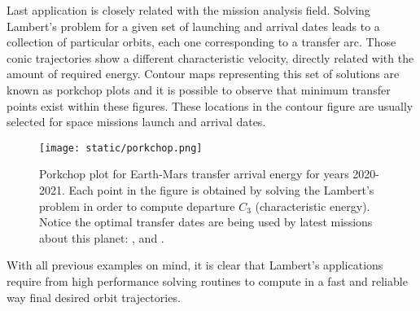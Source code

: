 Last application is closely related with the mission analysis field. Solving
Lambert's problem for a given set of launching and arrival dates leads to a
collection of particular orbits, each one corresponding to a transfer arc.
Those conic trajectories show a different characteristic velocity, directly
related with the amount of required energy.  Contour maps representing this set
of solutions are known as porkchop plots and it is possible to observe that minimum
transfer points exist within these figures.  These locations in the contour
figure are usually selected for space missions launch and arrival dates.

\begin{figure}[h]
  \centering
  \texttt{[image: static/porkchop.png]}
  \caption[Porkchop plot for Earth-Mars for years 2020-2021]{Porkchop plot for Earth-Mars transfer arrival energy for years 2020-2021.
    Each point in the figure is obtained by solving the Lambert's problem in order
    to compute departure $C_{3}$ (characteristic energy). Notice the optimal
    transfer dates are being used by latest missions about this planet:
    \cite{perseverance2020}, \cite{tianwen1} and \cite{hope2021}.}
  \label{fig:porkchop_perseverance}
\end{figure}

With all previous examples on mind, it is clear that Lambert's applications
require from high performance solving routines to compute in a fast and reliable
way final desired orbit trajectories.
